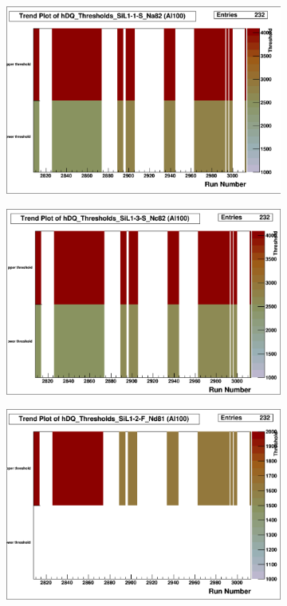 \documentclass[a4paper]{article}
\begin{document}
\begin{figure}
  \centering
  \begin{subfigure}{0.5\textwidth}
    \includegraphics[width=0.8\linewidth]{figs/al100/sil11s_thresh}
    \caption{}\label{fig:al100_sil11s_thresh}
  \end{subfigure}%
  \begin{subfigure}{0.5\textwidth}
    \includegraphics[width=0.8\linewidth]{figs/al100/sil13s_thresh}
    \caption{}\label{fig:al100_sil13s_thresh}
  \end{subfigure}
  \begin{subfigure}{0.5\textwidth}
    \includegraphics[width=0.8\linewidth]{figs/al100/sil12f_thresh}

\end{subfigure}
\end{figure}
\end{document}
